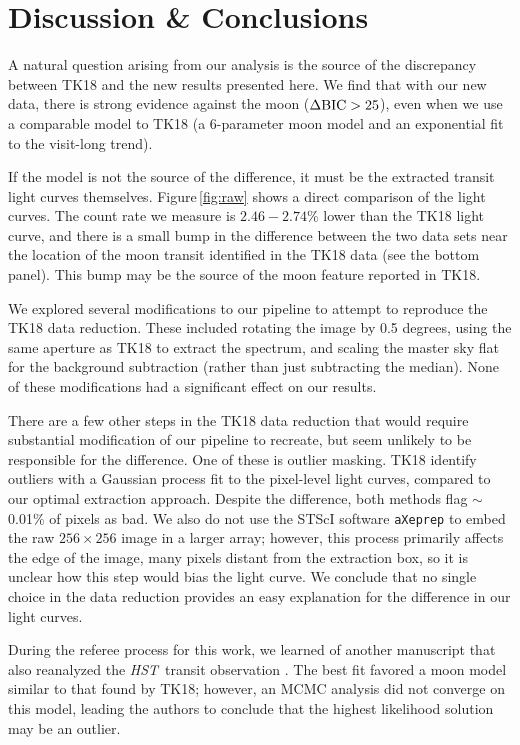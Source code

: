 \documentclass[twocolumn,trackchanges]{aastex62}
\newcommand{\project}[1]{\textsl{#1}}
\newcommand{\HST}{\project{HST}}
\begin{document}
\section{Discussion \& Conclusions}
A natural question arising from our analysis is the source of the discrepancy between TK18 and the new results presented here. We find that with our new data, there is strong evidence against the moon ($\Delta\rm{BIC} > 25$), even when we use a comparable model to TK18 (a 6-parameter moon model and an exponential fit to the visit-long trend).

If the model is not the source of the difference, it must be the extracted transit light curves themselves.  Figure\,\ref{fig:raw} shows a direct comparison of the light curves. The count rate we measure is $2.46 -2.74\%$ lower than the TK18 light curve, and there is a small bump in the difference between the two data sets near the location of the moon transit identified in the TK18 data (see the bottom panel). This bump may be the source of the moon feature reported in TK18.

 We explored several modifications to our pipeline to attempt to reproduce the TK18 data reduction. These included rotating the image by 0.5 degrees, using the same aperture as TK18 to extract the spectrum, and scaling the master sky flat for the background subtraction (rather than just subtracting the median). None of these modifications had a significant effect on our results. 

There are a few other steps in the TK18 data reduction that would require substantial modification of our pipeline to recreate, but seem unlikely to be responsible for the difference. One of these is outlier masking. TK18 identify outliers with a Gaussian process fit to the pixel-level light curves, compared to our optimal extraction approach. Despite the difference, both methods flag $\sim$0.01\% of pixels as bad.  We also do not use the STScI software \texttt{aXeprep} to embed the raw $256\times256$ image in a larger array; however, this process primarily affects the edge of the image, many pixels distant from the extraction box, so it is unclear how this step would bias the light curve.  We conclude that no single choice in the data reduction provides an easy explanation for the difference in our light curves. 

During the referee process for this work, we learned of another manuscript that also reanalyzed the \HST\ transit observation \citep{heller19}. The best fit favored a moon model similar to that found by TK18;  however, an MCMC analysis did not converge on this model, leading the authors to conclude that the highest likelihood solution may be an outlier.
 
\end{document}
